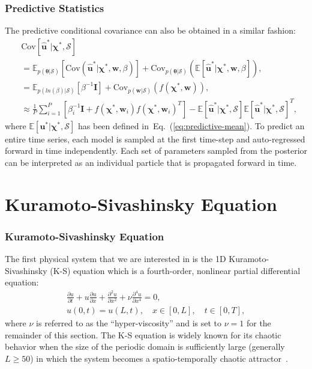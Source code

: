 \documentclass{beamer}
\theoremstyle{remark}
\newcommand{\viscosity}{\nu}
\def\Eqref#1{Eq.~(\ref{#1})}
\begin{document}
\begin{frame}
\frametitle{Predictive Statistics}
The predictive conditional covariance can also be obtained in a similar fashion:
\begin{align*}
   &\textrm{Cov}\left[\hat{\bm{u}}^{*}|\bm{\chi}^{*},\mathcal{S}\right]\\
    &= \mathbb{E}_{p\left(\bm{\theta}|\mathcal{S}\right)}
    \left[\textrm{Cov}\left(\hat{\bm{u}}^{*}|\bm{\chi}^{*},\textbf{w},\beta\right)\right] + \textrm{Cov}_{p(\bm{\theta}|\mathcal{S})}\left(\mathbb{E}\left[\hat{\bm{u}}^{*}|\bm{\chi}^{*},\textbf{w},\beta\right]\right),  \nonumber \\
    &= \mathbb{E}_{p(ln(\beta)|\mathcal{S})}\left[\beta^{-1}\bm{I}\right] + \textrm{Cov}_{p(\textbf{w}|\mathcal{S})}\left(f\left(\bm{\chi}^{*},\textbf{w}\right)\right),  \nonumber \\
    &\approx \frac{1}{P}\sum_{i=1}^{P}\left[\beta^{-1}_{i}\bm{I}+f\left(\bm{\chi}^{*},\textbf{w}_{i}\right)f\left(\bm{\chi}^{*},\textbf{w}_{i}\right)^{T}\right]- \mathbb{E}\left[\hat{\bm{u}}^{*}|\bm{\chi}^{*},\mathcal{S}\right]\mathbb{E}\left[\hat{\bm{u}}^{*}|\bm{\chi}^{*},\mathcal{S}\right]^{T},
\end{align*}
where $\mathbb{E}\left[\bm{u}^{*}|\bm{\chi}^{*},\mathcal{S}\right]$ has been defined in~\Eqref{eq:predictive-mean}.
To predict an entire time series, each model is sampled at the first time-step and  auto-regressed forward in time independently.
Each set of parameters sampled from the posterior can be interpreted as an individual particle that is propagated forward in time.

\end{frame}

\section{Kuramoto-Sivashinsky Equation}

\begin{frame}
\frametitle{Kuramoto-Sivashinsky Equation}
The first physical system that we are interested in is the 1D Kuramoto-Sivashinsky (K-S) equation which is a fourth-order, nonlinear partial differential equation:
\begin{gather}
    \frac{\partial u}{\partial t} + u\frac{\partial u}{\partial x} + \frac{\partial^{2} u}{\partial x^{2}} + \viscosity\frac{\partial^{4} u}{\partial x^{4}}= 0,\\
    u(0,t) = u(L,t), \quad x\in[0,L], \quad t\in[0,T],
\end{gather}
where $\viscosity$ is referred to as the ``hyper-viscosity'' and is set to $\viscosity=1$ for the remainder of this section.
The K-S equation is widely known for its chaotic behavior when the size of the periodic domain is sufficiently large (generally $L\ge50$) in which the system becomes a spatio-temporally chaotic attractor~\cite{hyman1986kuramoto}.
\end{frame}
\end{document}
